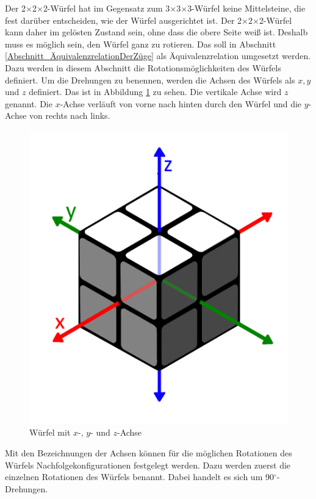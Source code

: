 \documentclass[12pt,a4paper, usenames, dvipsnames]{article}
\theoremstyle{mystyle}
\theoremstyle{definition}
\newcommand{\Ttwo}{2$\times$2$\times$2-}
\newcommand{\Tthree}{3$\times$3$\times$3-}
\begin{document}
Der \Ttwo Würfel hat im Gegensatz zum \Tthree Würfel keine Mittelsteine, die fest darüber entscheiden, wie der Würfel ausgerichtet ist. 
Der \Ttwo Würfel kann daher im gelösten Zustand sein, ohne dass die obere Seite weiß ist. Deshalb muss es möglich sein, den Würfel ganz zu rotieren.
Das soll in Abschnitt \ref{Abschnitt_ÄquivalenzrelationDerZüge} als Äquivalenzrelation umgesetzt werden. Dazu werden in diesem Abschnitt die Rotationsmöglichkeiten des Würfels definiert.
Um die Drehungen zu benennen, werden die Achsen des Würfels als $x, y$ und $z$ definiert. Das ist in Abbildung \ref{Abbildung_Rotationsachsen} zu sehen. Die vertikale Achse wird $z$ genannt. Die $x$-Achse verläuft von vorne nach hinten durch den Würfel und die $y$-Achse von rechts nach links.
\begin{figure}[H]
\centering
\includegraphics[scale=0.13]{Pfeile.png}
\caption[Würfel mit $x, y$ und $z$-Achsen]{Würfel mit $x$-, $y$- und $z$-Achse}
\label{Abbildung_Rotationsachsen}
\end{figure} 

Mit den Bezeichnungen der Achsen können für die möglichen Rotationen des Würfels Nachfolgekonfigurationen festgelegt werden. 
Dazu werden zuerst die einzelnen Rotationen des Würfels benannt. Dabei handelt es sich um 90$^\circ$-Drehungen.
\end{document}
